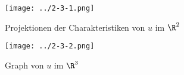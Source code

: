 \begin{solution}
\begin{enumerate}[label = (\roman*)]
	\begin{figure}[h!]
		\centering
		\texttt{[image: ../2-3-1.png]}
		\caption{Projektionen der Charakteristiken von $u$ im $\R^2$}
		\label{fig:lsg_u_char}
	\end{figure}

	\begin{figure}[h!]
		\centering
		\texttt{[image: ../2-3-2.png]}
		\caption{Graph von $u$ im $\R^3$}
		\label{fig:lsg_u_graph}
	\end{figure}
\end{enumerate}
\FloatBarrier
\end{solution}

